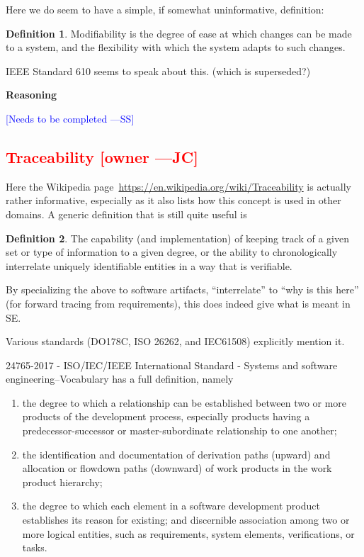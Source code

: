 \documentclass[letterpaper,cleveref]{lipics-v2019}
\newcommand{\authornote}[3]{\textcolor{#1}{[#3 ---#2]}}
\newcommand{\authornote}[3]{}
\newcommand{\wss}[1]{\authornote{blue}{SS}{#1}} %
\newcommand{\jc}[1]{\authornote{red}{JC}{#1}} %
\newcommand{\notdone}[1]{\textcolor{red}{#1}}
\theoremstyle{definition}
\newtheorem{defn}{Definition}
\begin{document}
Here we do seem to have a simple, if somewhat uninformative, definition:

\begin{defn}
Modifiability is the degree of ease at which changes can be made to a system,
and the flexibility with which the system adapts to such changes.
\end{defn}

IEEE Standard 610 seems to speak about this. (which is superseded?)

\noindent \textbf{Reasoning}

\wss{Needs to be completed}

\subsection{\notdone{Traceability} \jc{owner}}

Here the Wikipedia page~\url{https://en.wikipedia.org/wiki/Traceability} is
actually rather informative, especially as it also lists how this concept is
used in other domains.  A generic definition that is still quite useful is
\begin{defn}
The capability (and implementation) of keeping track of a given set or type of
information to a given degree, or the ability to chronologically interrelate
uniquely identifiable entities in a way that is verifiable.
\end{defn}
By specializing the above to software artifacts, ``interrelate'' to 
``why is this here'' (for forward tracing from requirements), this does
indeed give what is meant in SE.

Various standards (DO178C, ISO 26262, and IEC61508) explicitly mention it.

24765-2017 - ISO/IEC/IEEE International Standard - Systems and software engineering--Vocabulary
has a full definition, namely
\begin{enumerate}
\item the degree to which a relationship can be established between two or more
products of the development process, especially products having a
predecessor-successor or master-subordinate relationship to one another;
\item
the identification and documentation of derivation paths (upward) and
allocation or flowdown paths (downward) of work products in the work product
hierarchy;
\item the degree to which each element in a software development
product establishes its reason for existing; and discernible association
among two or more logical entities, such as requirements, system elements,
verifications, or tasks.
\end{enumerate}
\end{document}
